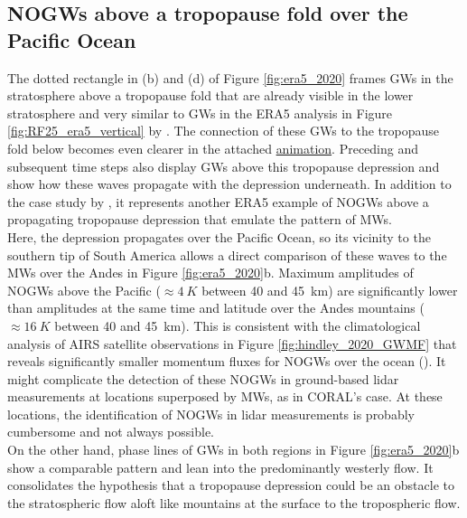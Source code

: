 \subsection*{NOGWs above a tropopause fold over the Pacific Ocean}
The dotted rectangle in (b) and (d) of Figure \ref{fig:era5_2020} frames GWs in the stratosphere above a tropopause fold that are already visible in the lower stratosphere and very similar to GWs in the ERA5 analysis in Figure \ref{fig:RF25_era5_vertical} by \textcite{dornbrack_stratospheric_2022}. The connection of these GWs to the tropopause fold below becomes even clearer in the attached \href{https://doi.org/10.5281/zenodo.7674038}{animation}\footnotemark[3]. Preceding and subsequent time steps also display GWs above this tropopause depression and show how these waves propagate with the depression underneath. In addition to the case study by \textcite{dornbrack_stratospheric_2022}, it represents another ERA5 example of NOGWs above a propagating tropopause depression that emulate the pattern of MWs.\\
Here, the depression propagates over the Pacific Ocean, so its vicinity to the southern tip of South America allows a direct comparison of these waves to the MWs over the Andes in Figure \ref{fig:era5_2020}b. Maximum amplitudes of NOGWs above the Pacific ($\approx \SI{4}{K}$ between 40 and \SI{45}{\kilo\meter}) are significantly lower than amplitudes at the same time and latitude over the Andes mountains ($\approx \SI{16}{K}$ between 40 and \SI{45}{\kilo\meter}). This is consistent with the climatological analysis of AIRS satellite observations in Figure \ref{fig:hindley_2020_GWMF} that reveals significantly smaller momentum fluxes for NOGWs over the ocean (\cite[]{hindley_18year_2020}). It might complicate the detection of these NOGWs in ground-based lidar measurements at locations superposed by MWs, as in CORAL's case. At these locations, the identification of NOGWs in lidar measurements is probably cumbersome and not always possible.\\
On the other hand, phase lines of GWs in both regions in Figure \ref{fig:era5_2020}b show a comparable pattern and lean into the predominantly westerly flow. It consolidates the hypothesis that a tropopause depression could be an obstacle to the stratospheric flow aloft like mountains at the surface to the tropospheric flow. 

